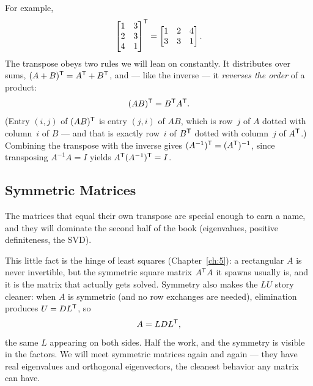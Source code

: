 For example,
\[
\begin{bmatrix} 1 & 3\\ 2 & 3\\ 4 & 1\end{bmatrix}^{\mathsf T}
=\begin{bmatrix} 1 & 2 & 4\\ 3 & 3 & 1\end{bmatrix}.
\]
The transpose obeys two rules we will lean on constantly. It distributes over sums, $(A+B)^{\mathsf T}=A^{\mathsf T}+B^{\mathsf T}$, and --- like the inverse --- it \emph{reverses the order} of a product:
\[
(AB)^{\mathsf T} = B^{\mathsf T} A^{\mathsf T}.
\]
(Entry $(i,j)$ of $(AB)^{\mathsf T}$ is entry $(j,i)$ of $AB$, which is row~$j$ of $A$ dotted with column~$i$ of $B$ --- and that is exactly row~$i$ of $B^{\mathsf T}$ dotted with column~$j$ of $A^{\mathsf T}$.) Combining the transpose with the inverse gives $(A^{-1})^{\mathsf T}=(A^{\mathsf T})^{-1}$, since transposing $A^{-1}A=I$ yields $A^{\mathsf T}(A^{-1})^{\mathsf T}=I$.

\subsection{Symmetric Matrices}

The matrices that equal their own transpose are special enough to earn a name, and they will dominate the second half of the book (eigenvalues, positive definiteness, the SVD).



This little fact is the hinge of least squares (Chapter~\ref{ch:5}): a rectangular $A$ is never invertible, but the symmetric square matrix $A^{\mathsf T} A$ it spawns usually is, and it is the matrix that actually gets solved. Symmetry also makes the $LU$ story cleaner: when $A$ is symmetric (and no row exchanges are needed), elimination produces $U=DL^{\mathsf T}$, so
\[
A = LDL^{\mathsf T},
\]
the same $L$ appearing on both sides. Half the work, and the symmetry is visible in the factors. We will meet symmetric matrices again and again --- they have real eigenvalues and orthogonal eigenvectors, the cleanest behavior any matrix can have.

